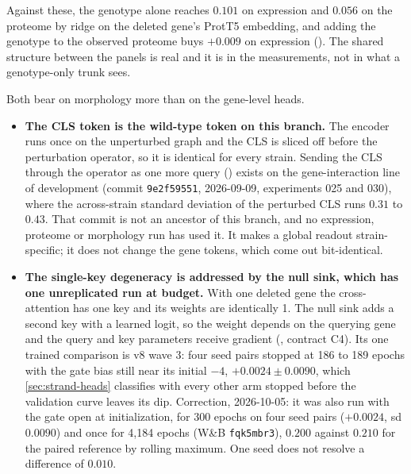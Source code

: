 

Against these, the genotype alone reaches $0.101$ on expression and $0.056$ on the proteome
by ridge on the deleted gene's ProtT5 embedding, and adding the genotype to the observed
proteome buys $+0.009$ on expression
(). The shared structure between
the panels is real and it is in the measurements, not in what a genotype-only trunk sees.

 Both bear on morphology more
than on the gene-level heads.
\begin{itemize}
\item \textbf{The CLS token is the wild-type token on this branch.} The encoder runs once on
  the unperturbed graph and the CLS is sliced off before the perturbation operator, so it is
  identical for every strain. Sending the CLS through the operator as one more query
  () exists on the gene-interaction line of development (commit
  \texttt{9e2f59551}, 2026-09-09, experiments 025 and 030), where the across-strain standard
  deviation of the perturbed CLS runs $0.31$ to $0.43$. That commit is not an ancestor of
  this branch, and no expression, proteome or morphology run has used it. It makes a global
  readout strain-specific; it does not change the gene tokens, which come out bit-identical.
\item \textbf{The single-key degeneracy is addressed by the null sink, which has one unreplicated run at budget.} With one deleted gene the cross-attention has one key and its
  weights are identically 1. The null sink adds a second key with a learned logit, so
  the weight depends on the querying gene and the query and key parameters receive gradient
  (, contract C4). Its one trained comparison is v8
  wave 3: four seed pairs stopped at 186 to 189 epochs with the gate bias still near its
  initial $-4$, $+0.0024 \pm 0.0090$, which
  \cref{sec:strand-heads} classifies with every other arm stopped before the validation
  curve leaves its dip. Correction, 2026-10-05: it was also run with the gate open at
  initialization, for 300 epochs on four seed pairs ($+0.0024$, sd $0.0090$) and once for
  4{,}184 epochs (W\&B \texttt{fqk5mbr3}), $0.200$ against $0.210$ for the paired reference
  by rolling maximum. One seed does not resolve a difference of $0.010$.
\end{itemize}

